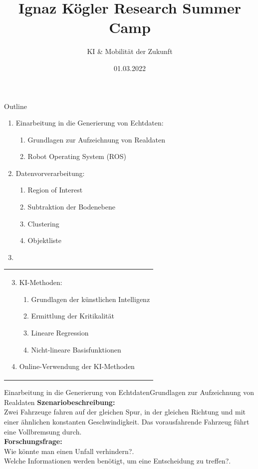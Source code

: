 \documentclass[169, handout	]{THIbeamer} %
\title{Ignaz Kögler Research Summer Camp}
\subtitle{KI \& Mobilität der Zukunft}
\date{01.03.2022}
\begin{document}
	\begin{frame}[plain]
		\maketitle
	\end{frame}
	\begin{frame}{Outline}
		\begin{minipage}{0.4\textwidth}
			\begin{enumerate}
				\item Einarbeitung in die Generierung von Echtdaten:
				\begin{enumerate}
					\item Grundlagen zur Aufzeichnung von Realdaten
					\item Robot Operating System (ROS)
				\end{enumerate}
				\item Datenvorverarbeitung:
				\begin{enumerate}
					\item Region of Interest
					\item Subtraktion der Bodenebene
					\item Clustering
					\item Objektliste
				\end{enumerate}
			\item[]
			\end{enumerate}
		\end{minipage}%
		\hfill
		\begin{minipage}{0.5\textwidth}
		\begin{tabular}{p{\textwidth}}
			\begin{enumerate}
				\setcounter{enumi}{2}	
				\item KI-Methoden: 				
				\begin{enumerate}
					\item Grundlagen der künstlichen Intelligenz					
					\item Ermittlung der Kritikalität	
					\item Lineare Regression 
					\item Nicht-lineare Basisfunktionen 
				\end{enumerate}	
				\item Online-Verwendung der KI-Methoden
			\end{enumerate}
		\end{tabular}
		\end{minipage}%
	\end{frame}
\begin{frame}{Einarbeitung in die Generierung von Echtdaten}{Grundlagen zur Aufzeichnung von Realdaten}
	\textbf{Szenariobeschreibung:}\\
	Zwei Fahrzeuge fahren auf der gleichen Spur, in der gleichen Richtung und mit einer ähnlichen konstanten Geschwindigkeit. Das vorausfahrende Fahrzeug führt eine Vollbremsung durch.\\
	\textbf{Forschungsfrage:} \\
	Wie könnte man einen Unfall verhindern?.\\
Welche Informationen werden benötigt, um eine Entscheidung zu treffen?.
\end{frame}
\end{document}
